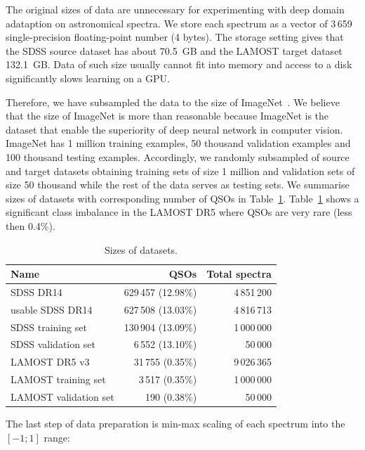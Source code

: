 The original sizes of data are unnecessary for experimenting with deep domain adataption on astronomical spectra.
We store each spectrum as a vector of 3\,659 single-precision floating-point number (4 bytes).
The storage setting gives that the SDSS source dataset has about 70.5~GB
and the LAMOST target dataset 132.1~GB.
Data of such size usually cannot fit into memory
and access to a disk significantly slows learning on a GPU.

Therefore, we have subsampled the data to the size of ImageNet~\cite{russakovsky2015}.
We believe that the size of ImageNet is more than reasonable
because ImageNet is the dataset
that enable the superiority of deep neural network in computer vision.
ImageNet has 1 million training examples, 50 thousand validation examples
and 100 thousand testing examples.
Accordingly, we randomly subsampled of source and target datasets
obtaining training sets of size 1 million
and validation sets of size 50 thousand
while the rest of the data serves as testing sets.
We summarise sizes of datasets with corresponding number of QSOs in Table~\ref{datasets_sizes}.
Table~\ref{datasets_sizes} shows a significant class imbalance in the LAMOST DR5
where QSOs are very rare (less then 0.4\%).

\begin{table}
	\begin{center}
	\begin{tabular}{|l|r|r|}
		\hline
		Name & QSOs & Total spectra \\ \hline \hline
		SDSS DR14 & 629\,457 (12.98\%) & 4\,851\,200 \\ \hline
		usable SDSS DR14 & 627\,508 (13.03\%) & 4\,816\,713 \\ \hline
		SDSS training set & 130\,904 (13.09\%) & 1\,000\,000 \\ \hline
		SDSS validation set & 6\,552 (13.10\%) & 50\,000 \\ \hline
		LAMOST DR5 v3 & 31\,755 (0.35\%) & 9\,026\,365 \\ \hline
		LAMOST training set & 3\,517 (0.35\%) & 1\,000\,000 \\ \hline
		LAMOST validation set & 190 (0.38\%) & 50\,000 \\ \hline
	\end{tabular}
	\end{center}
	\caption{Sizes of datasets.}
	\label{datasets_sizes}
\end{table}

The last step of data preparation is min-max scaling of each spectrum into the \([-1; 1]\) range:

